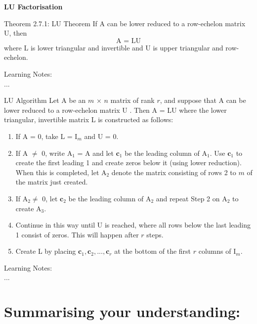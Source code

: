 \documentclass[
  12pt,
  a4paper,
]{article}
\begin{document}
\textbf{LU Factorisation}

\begin{box_cyan}{Theorem 2.7.1: LU Theorem}
If A can be lower reduced to a row-echelon matrix U, then 
$$\text{A = LU}$$
where L is lower triangular and invertible and U is upper triangular and row-echelon.
\end{box_cyan}
\noindent
Learning Notes:
\\...

\begin{box_cyan}{LU Algorithm}
Let A be an $m$ × $n$ matrix of rank $r$, and suppose that A can be lower reduced to a row-echelon matrix U . Then A = LU where the lower triangular, invertible matrix L is constructed as follows:
\begin{enumerate}
    \item If A = 0, take L = I$_m$ and U = 0.
    \item If A $\neq$ 0, write A$_1$ = A and let $\bm{c}_1$ be the leading column of A$_1$. Use $\bm{c}_1$ to create the first leading 1 and create zeros below it (using lower reduction). When this is completed, let A$_2$ denote the matrix consisting of rows 2 to $m$ of the matrix just created.
    \item If A$_2 \neq$ 0, let $\bm{c}_2$ be the leading column of A$_2$ and repeat Step 2 on A$_2$ to create A$_3$.
    \item Continue in this way until U is reached, where all rows below the last leading 1 consist of zeros. This will happen after $r$ steps.
    \item Create L by placing $\bm{c}_1, \bm{c}_2, ..., \bm{c}_r$ at the bottom of the first $r$ columns of I$_m$.
\end{enumerate}
\end{box_cyan}
\noindent
Learning Notes:
\\...

\section*{Summarising your understanding: }
\end{document}
